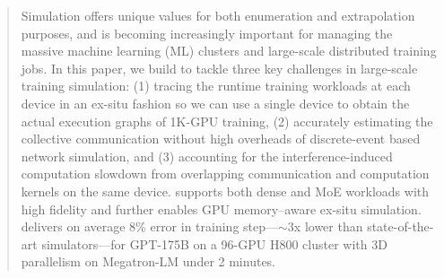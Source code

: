 
\begin{abstract}

Simulation offers unique values for both enumeration and extrapolation purposes, and is becoming increasingly important for managing the massive machine learning (ML) clusters and large-scale distributed training jobs.
In this paper, we build \sys to tackle three key challenges in large-scale training simulation:
(1) tracing the runtime training workloads at each device in an ex-situ fashion so we can use a single device to obtain the actual execution graphs of 1K-GPU training, (2) accurately estimating the collective communication without high overheads of discrete-event based network simulation, and (3) accounting for the interference-induced computation slowdown from overlapping communication and computation kernels on the same device.
\sys supports both dense and MoE workloads with high fidelity and further enables GPU memory–aware ex-situ simulation. 
\sys delivers on average 8\% error in training step---$\sim$3x lower than state-of-the-art simulators---for GPT-175B on a 96-GPU H800 cluster with 3D parallelism on Megatron-LM under 2 minutes.




\end{abstract}
